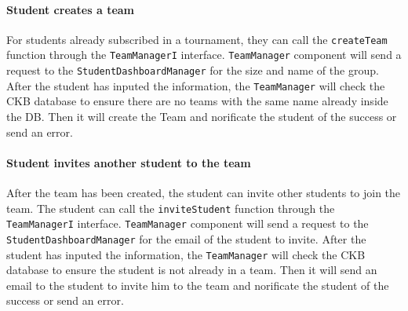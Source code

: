 \paragraph{Student creates a team}
For students already subscribed in a tournament, they can call the \verb|createTeam| function through the \verb|TeamManagerI| interface.
\verb|TeamManager| component will send a request to the \verb|StudentDashboardManager| for the size and name of the group. After the student has inputed the information, the \verb|TeamManager|
will check the CKB database to ensure there are no teams with the same name already inside the DB. Then it will create the Team and norificate the student of the success or send an error.

\paragraph{Student invites another student to the team}
After the team has been created, the student can invite other students to join the team. 
The student can call the \verb|inviteStudent| function through the \verb|TeamManagerI| interface.
\verb|TeamManager| component will send a request to the \verb|StudentDashboardManager| for the email of the student to invite. 
After the student has inputed the information, the \verb|TeamManager| will check the CKB database to ensure the student is not already in a team.
Then it will send an email to the student to invite him to the team and norificate the student of the success or send an error.

